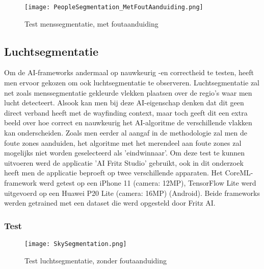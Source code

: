 \begin{figure}[H]
	\centering
	\texttt{[image: PeopleSegmentation\_MetFoutAanduiding.png]}
	\caption{Test menssegmentatie, met foutaanduiding}
\end{figure}

\subsection{Luchtsegmentatie}
Om de AI-frameworks andermaal op nauwkeurig -en correctheid te testen, heeft men ervoor gekozen om ook luchtsegmentatie te observeren. Luchtsegmentatie zal net zoals menssegmentatie gekleurde vlekken plaatsen over de regio's waar men lucht detecteert. Alsook kan men bij deze AI-eigenschap denken dat dit geen direct verband heeft met de wayfinding context, maar toch geeft dit een extra beeld over hoe correct en nauwkeurig het AI-algoritme de verschillende vlakken kan onderscheiden. Zoals men eerder al aangaf in de methodologie zal men de foute zones aanduiden, het algoritme met het merendeel aan foute zones zal mogelijks niet worden geselecteerd als 'eindwinnaar'. Om deze test te kunnen uitvoeren werd de applicatie 'AI Fritz Studio' gebruikt, ook in dit onderzoek heeft men de applicatie beproeft op twee verschillende apparaten. Het CoreML-framework werd getest op een iPhone 11 (camera: 12MP), TensorFlow Lite werd uitgevoerd op een Huawei P20 Lite (camera: 16MP) (Android). Beide frameworks werden getrained met een dataset die werd opgesteld door Fritz AI.

\newpage
\subsubsection{Test}
\begin{figure}[H]
	\centering
	\texttt{[image: SkySegmentation.png]}
	\caption{Test luchtsegmentatie, zonder foutaanduiding}
\end{figure}

